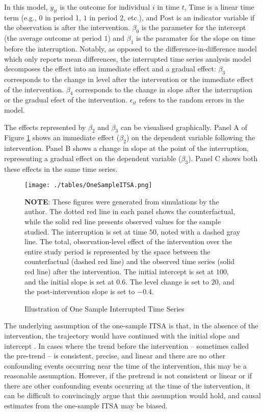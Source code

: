 \documentclass[12pt]{article}
\begin{document}
In this model, $y_{it}$ is the outcome for individual $i$ in time $t$, $\textrm{Time}$ is a linear time term (e.g., $0$ in period 1, $1$ in period 2, etc.), and $\textrm{Post}$ is an indicator variable if the observation is after the intervention. $\beta_0$ is the parameter for the intercept (the average outcome at period $1$) and $\beta_1$ is the paramater for the slope on time before the interruption. Notably, as opposed to the difference-in-difference model which only reports mean differences, the interrupted time series analysis model decomposes the effect into an immediate effect and a gradual effect: $\beta_3$ corresponds to the change in level after the intervention or the immediate effect of the intervention. $\beta_4$ corresponds to the change in slope after the interruption or the gradual efect of the intervention. $\epsilon_{it}$ refers to the random errors in the model.

The effects represented by $\beta_2$ and $\beta_3$ can be visualised graphically. Panel A of Figure \ref{fig:OneSampleITSA} shows an immediate effect ($\beta_2$) on the dependent variable following the intervention. Panel B shows a change in slope at the point of the interruption, representing a gradual effect on the dependent variable ($\beta_3$). Panel C shows both these effects in the same time series.


\begin{figure}
    \centering
    \caption{Illustration of One Sample Interrupted Time Series}
    \texttt{[image: ./tables/OneSampleITSA.png]}
    \begin{minipage}{\textwidth}
    \footnotesize
    \textbf{NOTE}: These figures were generated from simulations by the author. The dotted red line in each panel shows the counterfactual, while the solid red line presents observed values for the sample studied. The interruption is set at time $50$, noted with a dashed gray line. The total, observation-level effect of the intervention over the entire study period is represented by the space between the counterfactual (dashed red line) and the observed time series (solid red line) after the intervention. The initial intercept is set at $100$, and the initial slope is set at $0.6$. The level change is set to $20$, and the post-intervention slope is set to $-0.4$.
    \end{minipage}
    \label{fig:OneSampleITSA}
\end{figure}


The underlying assumption of the one-sample ITSA is that, in the absence of the intervention, the trajectory would have continued with the initial slope and intercept \citep{penfoldUseInterruptedTime2013}. In cases where the trend before the intervention -- sometimes called the pre-trend -- is consistent, precise, and linear and there are no other confounding events occurring near the time of the intervention, this may be a reasonable assumption. However, if the pretrend is not consistent or linear or if there are other confounding events occurring at the time of the intervention, it can be difficult to convincingly argue that this assumption would hold, and causal estimates from the one-sample ITSA may be biased.
\end{document}

